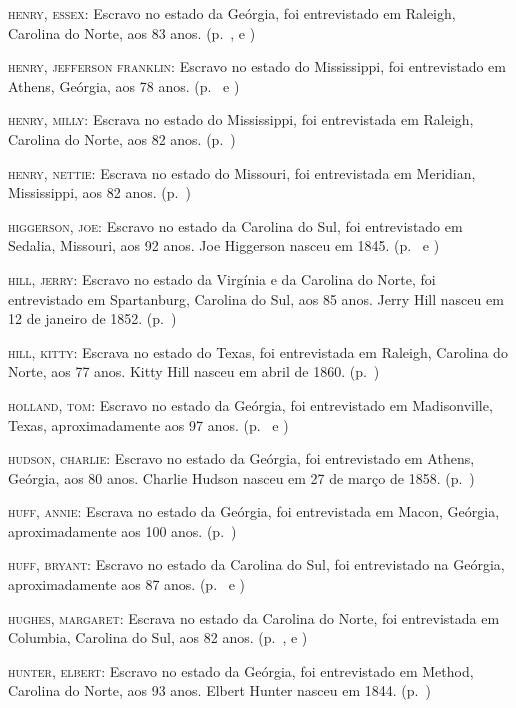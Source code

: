 \begin{Parskip}
\textsc{henry, essex:} Escravo no estado da Geórgia, foi entrevistado em
Raleigh, Carolina do Norte, aos 83 anos. (p.~\pageref{ref136}, \pageref{ref137} e \pageref{ref138})

\textsc{henry, jefferson franklin:} Escravo no estado do Mississippi,
foi entrevistado em Athens, Geórgia, aos 78 anos. (p.~\pageref{ref139} e \pageref{ref140})

\textsc{henry, milly:} Escrava no estado do Mississippi, foi
entrevistada em Raleigh, Carolina do Norte, aos 82 anos. (p.~\pageref{ref141})

\textsc{henry, nettie:} Escrava no estado do Missouri, foi entrevistada
em Meridian, Mississippi, aos 82 anos. (p.~\pageref{ref142})

\textsc{higgerson, joe:} Escravo no estado da Carolina do Sul, foi
entrevistado em Sedalia, Missouri, aos 92 anos. Joe Higgerson nasceu em
1845. (p.~\pageref{ref143} e \pageref{ref144})

\textsc{hill, jerry:} Escravo no estado da Virgínia e da Carolina do
Norte, foi entrevistado em Spartanburg, Carolina do Sul, aos 85 anos.
Jerry Hill nasceu em 12 de janeiro de 1852. (p.~\pageref{ref145})

\textsc{hill, kitty:} Escrava no estado do Texas, foi entrevistada em
Raleigh, Carolina do Norte, aos 77 anos. Kitty Hill nasceu em abril de
1860. (p.~\pageref{ref146})

\textsc{holland, tom:} Escravo no estado da Geórgia, foi entrevistado em
Madisonville, Texas, aproximadamente aos 97 anos. (p.~\pageref{ref147} e \pageref{ref148})

\textsc{hudson, charlie:} Escravo no estado da Geórgia, foi entrevistado
em Athens, Geórgia, aos 80 anos. Charlie Hudson nasceu em 27 de março de
1858. (p.~\pageref{ref149})

\textsc{huff, annie:} Escrava no estado da Geórgia, foi entrevistada em
Macon, Geórgia, aproximadamente aos 100 anos. (p.~\pageref{ref150})

\textsc{huff, bryant:} Escravo no estado da Carolina do Sul, foi
entrevistado na Geórgia, aproximadamente aos 87 anos. (p.~\pageref{ref151} e \pageref{ref152})

\textsc{hughes, margaret:} Escrava no estado da Carolina do Norte, foi
entrevistada em Columbia, Carolina do Sul, aos 82 anos. (p.~\pageref{ref153}, \pageref{ref154} e \pageref{ref155})

\textsc{hunter, elbert:} Escravo no estado da Geórgia, foi entrevistado
em Method, Carolina do Norte, aos 93 anos. Elbert Hunter nasceu em 1844. (p.~\pageref{ref156})


\end{Parskip}
